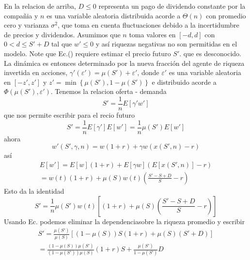 \documentclass[12pt]{article}
\begin{document}
En la relacion de arriba, $D\leq 0$ representa un pago de dividendo constante por la compañia y $n$ es una variable aleatoria distribuida acorde a $\Theta(n)$ con promedio cero y varianza $\sigma^2$, que toma en cuenta fluctuaciones debido a la incertidumbre de precios y dividendos. Asumimos que $n$ toma valores en $[-d,d]$ con $0<d\leq S'+D $ tal que $w'\leq 0$ y así riquezas negativas no son permitidas en el modelo. Note que Ec.(\cite{ec15}) requiere estimar el precio futuro $S'$. que es desconocido.
La dinámica es entonces determinado por la nueva fracción del agente de riqueza invertida en acciones, $\gamma'(\varepsilon')=\mu(S')+\varepsilon'$, donde $\varepsilon'$ es una variable aleatoria en $[-z',z']$ y 
$z'= \min \left\{ \mu(S'),1-\mu(S')\right\}$ e distribuido acorde a $\Phi(\mu(S'),\varepsilon')$. Tenemos la relacion oferta - demanda
\begin{equation}
S'=\frac{1}{n}E[\gamma'w']
\end{equation}
que nos permite escribir para el recio futuro
\begin{equation}
S'= \frac{1}{n} E[\gamma']E[w']= \frac{1}{n}\mu(S')E[w']\label{ec17}
\end{equation}
ahora
\begin{equation}
w'(S',\gamma,n)= w(1+r) + \gamma w (x(S',n)-r)
\end{equation}
así
\begin{eqnarray}
E[w']= E[w](1+r)+E[\gamma w](E[x(S',n)]-r) \\
=w(t)(1+r)+\mu (S)w(t)\left(\frac{ S'-S+D}{S}-r\right)
\end{eqnarray}
Esto da la identidad
\begin{equation}
S'=\frac{1}{n} \mu (S')w(t)\left[(1+r)+\mu(S)\left(\frac{S'-S+D}{S}-r\right) \right]
\end{equation}
Usando Ec.\cite{ec12} podemos eliminar la dependenciasobre la riqueza promedio y escribir
\begin{eqnarray}
S'=\frac{\mu(S')}{\mu(S)}\left[(1-\mu(S))S(1+r)+\mu(S)(S'+D) \right] \nonumber \\
= \frac{(1-\mu(S))\mu(S')}{(1-\mu(S'))\mu(S)}(1+r)S+\frac{\mu(S')}{1-\mu(S')}D\label{ec22}
\end{eqnarray}
\end{document}
